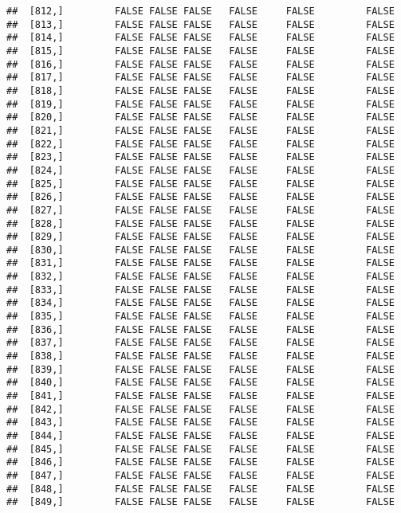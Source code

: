 \documentclass[
]{article}
\begin{document}
\begin{verbatim}
##  [812,]         FALSE FALSE FALSE   FALSE     FALSE         FALSE
##  [813,]         FALSE FALSE FALSE   FALSE     FALSE         FALSE
##  [814,]         FALSE FALSE FALSE   FALSE     FALSE         FALSE
##  [815,]         FALSE FALSE FALSE   FALSE     FALSE         FALSE
##  [816,]         FALSE FALSE FALSE   FALSE     FALSE         FALSE
##  [817,]         FALSE FALSE FALSE   FALSE     FALSE         FALSE
##  [818,]         FALSE FALSE FALSE   FALSE     FALSE         FALSE
##  [819,]         FALSE FALSE FALSE   FALSE     FALSE         FALSE
##  [820,]         FALSE FALSE FALSE   FALSE     FALSE         FALSE
##  [821,]         FALSE FALSE FALSE   FALSE     FALSE         FALSE
##  [822,]         FALSE FALSE FALSE   FALSE     FALSE         FALSE
##  [823,]         FALSE FALSE FALSE   FALSE     FALSE         FALSE
##  [824,]         FALSE FALSE FALSE   FALSE     FALSE         FALSE
##  [825,]         FALSE FALSE FALSE   FALSE     FALSE         FALSE
##  [826,]         FALSE FALSE FALSE   FALSE     FALSE         FALSE
##  [827,]         FALSE FALSE FALSE   FALSE     FALSE         FALSE
##  [828,]         FALSE FALSE FALSE   FALSE     FALSE         FALSE
##  [829,]         FALSE FALSE FALSE   FALSE     FALSE         FALSE
##  [830,]         FALSE FALSE FALSE   FALSE     FALSE         FALSE
##  [831,]         FALSE FALSE FALSE   FALSE     FALSE         FALSE
##  [832,]         FALSE FALSE FALSE   FALSE     FALSE         FALSE
##  [833,]         FALSE FALSE FALSE   FALSE     FALSE         FALSE
##  [834,]         FALSE FALSE FALSE   FALSE     FALSE         FALSE
##  [835,]         FALSE FALSE FALSE   FALSE     FALSE         FALSE
##  [836,]         FALSE FALSE FALSE   FALSE     FALSE         FALSE
##  [837,]         FALSE FALSE FALSE   FALSE     FALSE         FALSE
##  [838,]         FALSE FALSE FALSE   FALSE     FALSE         FALSE
##  [839,]         FALSE FALSE FALSE   FALSE     FALSE         FALSE
##  [840,]         FALSE FALSE FALSE   FALSE     FALSE         FALSE
##  [841,]         FALSE FALSE FALSE   FALSE     FALSE         FALSE
##  [842,]         FALSE FALSE FALSE   FALSE     FALSE         FALSE
##  [843,]         FALSE FALSE FALSE   FALSE     FALSE         FALSE
##  [844,]         FALSE FALSE FALSE   FALSE     FALSE         FALSE
##  [845,]         FALSE FALSE FALSE   FALSE     FALSE         FALSE
##  [846,]         FALSE FALSE FALSE   FALSE     FALSE         FALSE
##  [847,]         FALSE FALSE FALSE   FALSE     FALSE         FALSE
##  [848,]         FALSE FALSE FALSE   FALSE     FALSE         FALSE
##  [849,]         FALSE FALSE FALSE   FALSE     FALSE         FALSE

\end{verbatim}
\end{document}
